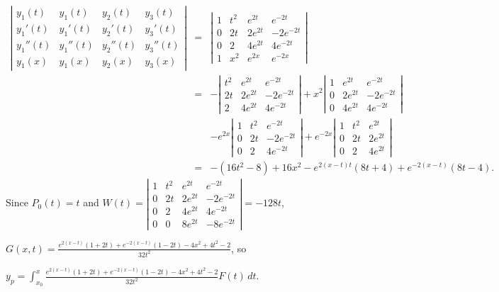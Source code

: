 \documentclass{ximera}
\begin{document}
\begin{problem}
\begin{solution}
\begin{eqnarray*}
\left|\begin{array}{crcc}
y_1(t)&y_1(t)&y_2(t)&y_3(t)\\
y_1'(t)&y_1'(t)&y_2'(t)&y_3'(t)\\
y_1''(t)&y_1''(t)&y_2''(t)&y_3''(t)\\
y_1(x)&y_1(x)&y_2(x)&y_3(x)
\end{array}\right|&=&
\left|\begin{array}{cccc}
1&t^2&e^{2t}&e^{-2t}\\
0&2t&2e^{2t}&-2e^{-2t}\\
0&2&4e^{2t}&4e^{-2t}\\
1&x^2&e^{2x}&e^{-2x}
\end{array}\right|\\
&=&-\left|\begin{array}{cccc}t^2&e^{2t}&e^{-2t}\\
2t&2e^{2t}&-2e^{-2t}\\2&4e^{2t}&4e^{-2t}\end{array}\right|
+x^2\left|\begin{array}{cccc}1&e^{2t}&e^{-2t}\\
0&2e^{2t}&-2e^{-2t}\\0&4e^{2t}&4e^{-2t}\end{array}\right|\\
&&-e^{2x}\left|\begin{array}{cccc}1&t^2&e^{-2t}\\
0&2t&-2e^{-2t}\\0&2&4e^{-2t}\end{array}\right|
+e^{-2x}\left|\begin{array}{cccc}1&t^2&e^{2t}\\0&2t&2e^{2t}\\
0&2&4e^{2t}\end{array}\right|\\
&=&-(16t^2-8)+16x^2-e^{2(x-t)t}(8t+4)+e^{-2(x-t)}(8t-4).
\end{eqnarray*}
Since $P_0(t)=t$ and
$W(t)=\left|\begin{array}{cccc}
1&t^2&e^{2t}&e^{-2t}\\
0&2t&2e^{2t}&-2e^{-2t}\\
0&2&4e^{2t}&4e^{-2t}\\
0&0&8e^{2t}&-8e^{-2t}
\end{array}\right|=-128t$,

$G(x,t)=\frac{e^{2(x-t)}(1+2t)+e^{-2(x-t)}(1-2t)-4x^2+4t^2-2}{32t^2}$,
so

$y_p=\int_{x_0}^x
\frac{e^{2(x-t)}(1+2t)+e^{-2(x-t)}(1-2t)-4x^2+4t^2-2}{32t^2}
F(t)\,dt$.
\end{solution}
\end{problem}
\end{document}
